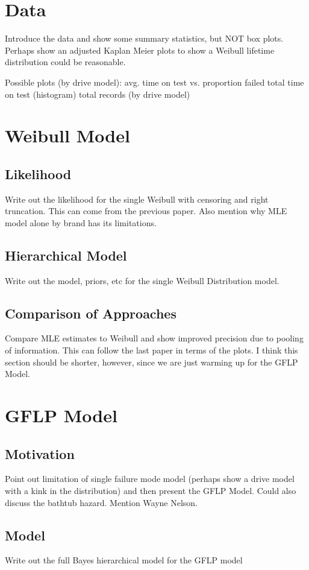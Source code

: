 \documentclass[12pt]{article}
\begin{document}
\section{Data}
Introduce the data and show some summary statistics, but NOT box plots.  Perhaps show an adjusted Kaplan Meier plots to show a Weibull lifetime distribution could be reasonable.

Possible plots (by drive model):
avg. time on test vs. proportion failed
total time on test (histogram)
total records (by drive model)

     
\section{Weibull Model}
\subsection{Likelihood}
Write out the likelihood for the single Weibull with censoring and right truncation.  This can come from the previous paper.  Also mention why MLE model alone by brand has its limitations.
\subsection{Hierarchical Model}
Write out the model, priors, etc for the single Weibull Distribution model.
\subsection{Comparison of Approaches}
Compare MLE estimates to Weibull and show improved precision due to pooling of information.  This can follow the last paper in terms of the plots.  I think this section should be shorter, however, since we are just warming up for the GFLP Model.


\section{GFLP Model}
\subsection{Motivation}
Point out limitation of single failure mode model (perhaps show a drive model with a kink in the distribution) and then present the GFLP Model.  Could also discuss the bathtub hazard.  Mention Wayne Nelson.
\subsection{Model}
Write out the full Bayes hierarchical model for the GFLP model
\end{document}
